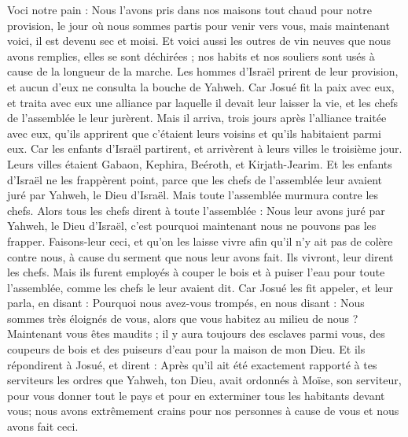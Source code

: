 \begin{multicols}{2}
Voci notre pain : Nous l'avons pris dans nos maisons tout chaud pour notre provision, le jour où nous sommes partis pour venir vers vous, mais maintenant voici, il est devenu sec et moisi.
Et voici aussi les outres de vin neuves que nous avons remplies, elles se sont déchirées ; nos habits et nos souliers sont usés à cause de la longueur de la marche.
Les hommes d'Israël prirent de leur provision, et aucun d'eux ne consulta la bouche de Yahweh.
Car Josué fit la paix avec eux, et traita avec eux une alliance par laquelle il devait leur laisser la vie, et les chefs de l'assemblée le leur jurèrent.
Mais il arriva, trois jours après l'alliance traitée avec eux, qu'ils apprirent que c'étaient leurs voisins et qu'ils habitaient parmi eux.
Car les enfants d'Israël partirent, et arrivèrent à leurs villes le troisième jour. Leurs villes étaient Gabaon, Kephira, Beéroth, et Kirjath-Jearim.
Et les enfants d'Israël ne les frappèrent point, parce que les chefs de l'assemblée leur avaient juré par Yahweh, le Dieu d'Israël. Mais toute l'assemblée murmura contre les chefs.
Alors tous les chefs dirent à toute l'assemblée : Nous leur avons juré par Yahweh, le Dieu d'Israël, c'est pourquoi maintenant nous ne pouvons pas les frapper.
Faisons-leur ceci, et qu'on les laisse vivre afin qu'il n'y ait pas de colère contre nous, à cause du serment que nous leur avons fait.
Ils vivront, leur dirent les chefs. Mais ils furent employés à couper le bois et à puiser l'eau pour toute l'assemblée, comme les chefs le leur avaient dit.
Car Josué les fit appeler, et leur parla, en disant : Pourquoi nous avez-vous trompés, en nous disant : Nous sommes très éloignés de vous, alors que vous habitez au milieu de nous ?
Maintenant vous êtes maudits ; il y aura toujours des esclaves parmi vous, des coupeurs de bois et des puiseurs d'eau pour la maison de mon Dieu.
Et ils répondirent à Josué, et dirent : Après qu'il ait été exactement rapporté à tes serviteurs les ordres que Yahweh, ton Dieu, avait ordonnés à Moïse, son serviteur, pour vous donner tout le pays et pour en exterminer tous les habitants devant vous; nous avons extrêmement crains pour nos personnes à cause de vous et nous avons fait ceci. 

\end{multicols}
